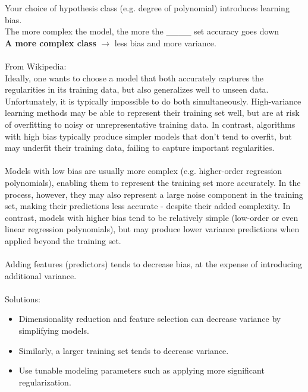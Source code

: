 Your choice of hypothesis class (e.g. degree of polynomial) introduces learning bias.  \hfill \\
The more complex the model, the more the \_\_\_\_ set accuracy goes down  \hfill \\  %
\textbf{A more complex class } $\rightarrow$ less bias and more variance.   \hfill \\ \hfill \\

From Wikipedia: \hfill \\  %
Ideally, one wants to choose a model that both accurately captures the regularities in its training data, 
but also generalizes well to unseen data. Unfortunately, it is typically impossible to do both simultaneously. 
High-variance learning methods may be able to represent their training set well, but are at risk of overfitting 
to noisy or unrepresentative training data. 
In contrast, algorithms with high bias typically produce simpler models that don't tend to overfit, 
but may underfit their training data, failing to capture important regularities. \hfill \\  \hfill \\

Models with low bias are usually more complex (e.g. higher-order regression polynomials), 
enabling them to represent the training set more accurately. 
In the process, however, they may also represent a large noise component in the training set, 
making their predictions less accurate - despite their added complexity. 
In contrast, models with higher bias tend to be relatively simple (low-order or even linear regression polynomials), 
but may produce lower variance predictions when applied beyond the training set. \hfill \\ \hfill \\

Adding features (predictors) tends to decrease bias, at the expense of introducing additional variance.   \hfill \\
\hfill \\

Solutions:
\begin{itemize}
	\item Dimensionality reduction and feature selection can decrease variance by simplifying models. 
	\item Similarly, a larger training set tends to decrease variance. 
	\item Use tunable modeling parameters such as applying more significant regularization.
\end{itemize}

